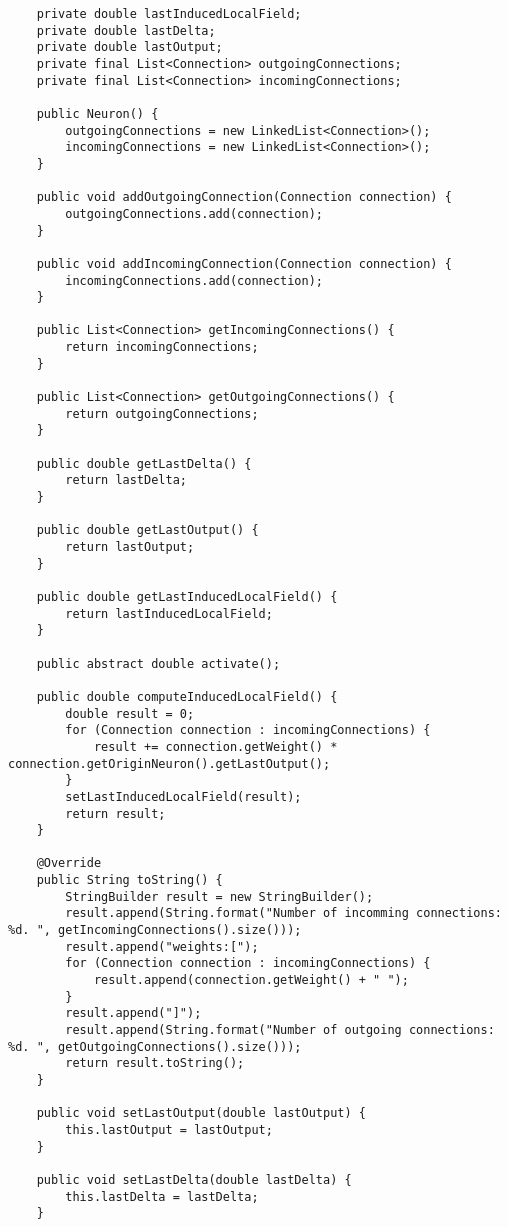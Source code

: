 \documentclass[paper=a4, fontsize=11pt]{scrartcl} %
\numberwithin{equation}{section} %
\numberwithin{figure}{section} %
\numberwithin{table}{section} %
\begin{document}
\begin{lstlisting}
    private double lastInducedLocalField;
    private double lastDelta;
    private double lastOutput;
    private final List<Connection> outgoingConnections;
    private final List<Connection> incomingConnections;

    public Neuron() {
        outgoingConnections = new LinkedList<Connection>();
        incomingConnections = new LinkedList<Connection>();
    }

    public void addOutgoingConnection(Connection connection) {
        outgoingConnections.add(connection);
    }

    public void addIncomingConnection(Connection connection) {
        incomingConnections.add(connection);
    }

    public List<Connection> getIncomingConnections() {
        return incomingConnections;
    }

    public List<Connection> getOutgoingConnections() {
        return outgoingConnections;
    }

    public double getLastDelta() {
        return lastDelta;
    }

    public double getLastOutput() {
        return lastOutput;
    }

    public double getLastInducedLocalField() {
        return lastInducedLocalField;
    }

    public abstract double activate();

    public double computeInducedLocalField() {
        double result = 0;
        for (Connection connection : incomingConnections) {
            result += connection.getWeight() * connection.getOriginNeuron().getLastOutput();
        }
        setLastInducedLocalField(result);
        return result;
    }

    @Override
    public String toString() {
        StringBuilder result = new StringBuilder();
        result.append(String.format("Number of incomming connections: %d. ", getIncomingConnections().size()));
        result.append("weights:[");
        for (Connection connection : incomingConnections) {
            result.append(connection.getWeight() + " ");
        }
        result.append("]");
        result.append(String.format("Number of outgoing connections: %d. ", getOutgoingConnections().size()));
        return result.toString();
    }

    public void setLastOutput(double lastOutput) {
        this.lastOutput = lastOutput;
    }

    public void setLastDelta(double lastDelta) {
        this.lastDelta = lastDelta;
    }


\end{lstlisting}
\end{document}
